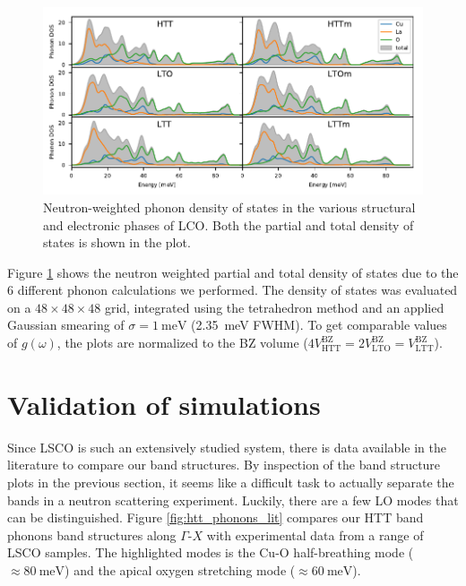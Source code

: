 \begin{figure}
	\centering
	\includegraphics[width=\textwidth]{fig/simulation/dos_all.pdf}
	\caption[Neutron DOS (frozen-phonons)]{Neutron-weighted phonon density of states in the various structural and electronic phases of LCO. Both the partial and total density of states is shown in the plot.}
	\label{fig:dos_all}
\end{figure}

Figure \ref{fig:dos_all} shows the neutron weighted partial and total density of states due to the 6 different phonon calculations we performed. The density of states was evaluated on a $48 \times 48 \times 48$ grid, integrated using the tetrahedron method and an applied Gaussian smearing of $\sigma=\SI{1}{\milli\eV}$ (\SI{2.35}{\milli\eV} FWHM). To get comparable values of $g(\omega)$, the plots are normalized to the BZ volume ($4V^\text{BZ}_\text{HTT} = 2 V^\text{BZ}_\text{LTO} = V^\text{BZ}_\text{LTT}$).

\section{Validation of simulations}
Since LSCO is such an extensively studied system, there is data available in the literature to compare our band structures. By inspection of the band structure plots in the previous section, it seems like a difficult task to actually separate the bands in a neutron scattering experiment. Luckily, there are a few LO modes that can be distinguished. Figure \ref{fig:htt_phonons_lit} compares our HTT band phonons band structures along $\Gamma$-$X$ with experimental data from a range of LSCO samples. The highlighted modes is the Cu-O half-breathing mode ($\approx \SI{80}{\milli\eV}$) and the apical oxygen stretching mode ($\approx \SI{60}{\milli\eV}$).

